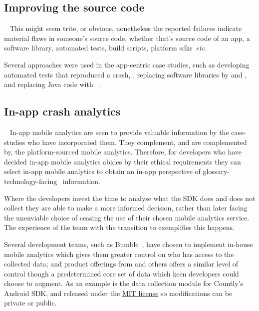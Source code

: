 \subsection{Improving the source code}~\label{aata-improving-the-sourcecode-topic}
This might seem trite, or obvious, nonetheless the reported failures indicate material flaws in someone's source code, whether that's source code of an app, a software library, automated tests, build scripts, platform \Glspl{sdk}~\emph{etc.}

Several approaches were used in the app-centric case studies, such as developing automated tests that reproduced a crash, , replacing software libraries by  and , and replacing Java code with ~. 

\subsection{In-app crash analytics}~\label{aata-in-app-crash-analytics-topic}
In-app mobile analytics are seen to provide valuable information by the case-studies who have incorporated them. They complement, and are complemented by, the platform-sourced mobile analytics. Therefore, for developers who have decided in-app mobile analytics abides by their ethical requirements they can select in-app mobile analytics to obtain an in-app perspective of \Gls{glossary-technology-facing}~ information. 

Where the developers invest the time to analyse what the SDK does and does not collect they are able to make a more informed decision, rather than later facing the unenviable choice of ceasing the use of their chosen mobile analytics service. The experience of the  team with the transition to  exemplifies this happens.

Several development teams, such as Bumble~, have chosen to implement in-house mobile analytics which gives them greater control on who has access to the collected data; and product offerings from  and others offers a similar level of control though a predetermined core set of data which keen developers could choose to augment. As an example  is the data collection module for Countly's Android SDK, and released under the \href{https://github.com/Countly/countly-sdk-android/blob/master/LICENSE}{MIT license} so modifications can be private or public.

